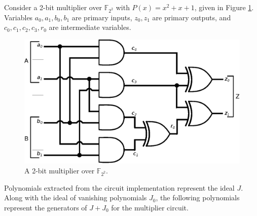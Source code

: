 \begin{Example}
\label{exp:finalMul2Bit}
Consider a 2-bit multiplier over ${\mathbb{F}}_{2^2}$ with
$P(x)=x^{2}+x+1$, given in Figure \ref{fig:2bitmul}. Variables $a_0,
a_1, b_0, b_1$ are primary inputs, $z_0, z_1$ are primary outputs, and
$c_0, c_1, c_2, c_3, r_0$ are intermediate variables. 

\begin{figure}[H]
\centerline{
\includegraphics[scale=0.5]{./figures/2bitmasmult.eps}
}
\caption{ A 2-bit multiplier over ${\mathbb{F}}_{2^2}$.}
\label{fig:2bitmul}
\end{figure}

Polynomials extracted from the circuit implementation represent the
ideal $J$. Along with the ideal of vanishing polynomials $J_0$, 
the following polynomials represent the generators 
of $J+J_0$ for the multiplier circuit. 


\end{Example}
